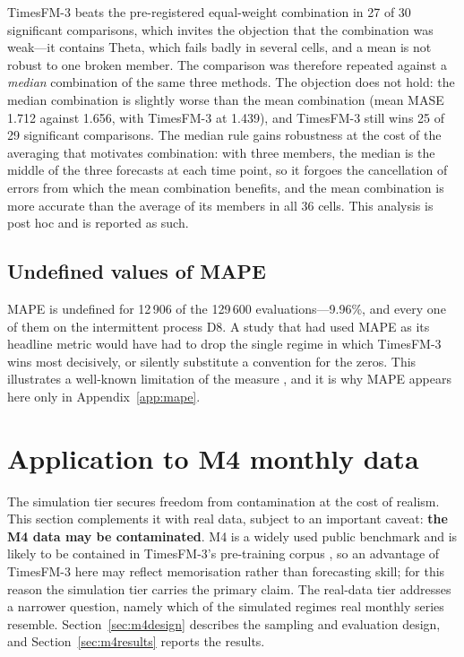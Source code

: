 \documentclass[article]{ajs}
\providecommand{\sectionref}[1]{Section~\ref{#1}}
\providecommand{\appendixref}[1]{Appendix~\ref{#1}}
\begin{document}
TimesFM-3 beats the pre-registered equal-weight combination in 27 of 30 significant
comparisons, which invites the objection that the combination was weak---it contains Theta,
which fails badly in several cells, and a mean is not robust to one broken member. The comparison
was therefore repeated against a \emph{median} combination of the same three methods. The
objection does not hold: the median combination is slightly worse than the mean combination
(mean MASE 1.712 against 1.656, with TimesFM-3 at 1.439), and TimesFM-3 still wins 25 of 29
significant comparisons. The median rule gains robustness at the cost of the averaging that
motivates combination: with three members, the median is the middle of the three forecasts at
each time point, so it forgoes the cancellation of errors from which the mean combination
benefits, and the mean combination is more accurate than the average of its members in all 36
cells. This analysis is post hoc and is reported as such.

\subsection{Undefined values of MAPE}
\label{sec:mape}

MAPE is undefined for 12\,906 of the 129\,600 evaluations---9.96\%, and every one of
them on the intermittent process D8. A study that had used MAPE as its headline metric would
have had to drop the single regime in which TimesFM-3 wins most decisively, or silently
substitute a convention for the zeros. This illustrates a well-known limitation of the measure
\citep{hyndman2006mase, kolassa2016count}, and it is why MAPE appears here only in
\appendixref{app:mape}.

\section{Application to M4 monthly data}
\label{sec:realdata}

The simulation tier secures freedom from contamination at the cost of realism. This section
complements it with real data, subject to an important caveat: \textbf{the M4 data may be
contaminated}. M4 is a widely used public benchmark and is likely to be contained in TimesFM-3's
pre-training corpus \citep{meyer2025leakage}, so an advantage of TimesFM-3 here may reflect
memorisation rather than forecasting skill; for this reason the simulation tier carries the
primary claim. The real-data tier addresses a narrower question, namely which of the simulated
regimes real monthly series resemble. \sectionref{sec:m4design} describes the sampling and
evaluation design, and \sectionref{sec:m4results} reports the results.
\end{document}

